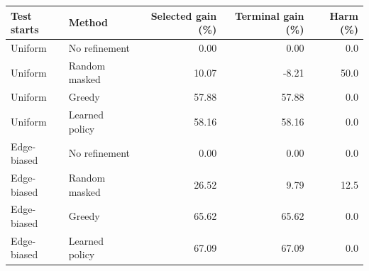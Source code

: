 \begin{tabular}{@{}llrrr@{}}
\toprule
Test starts & Method & Selected gain (\%) & Terminal gain (\%) & Harm (\%)\\
\midrule
Uniform & No refinement & 0.00 & 0.00 & 0.0 \\
Uniform & Random masked & 10.07 & -8.21 & 50.0 \\
Uniform & Greedy & 57.88 & 57.88 & 0.0 \\
Uniform & Learned policy & 58.16 & 58.16 & 0.0 \\
Edge-biased & No refinement & 0.00 & 0.00 & 0.0 \\
Edge-biased & Random masked & 26.52 & 9.79 & 12.5 \\
Edge-biased & Greedy & 65.62 & 65.62 & 0.0 \\
Edge-biased & Learned policy & 67.09 & 67.09 & 0.0 \\
\bottomrule
\end{tabular}
